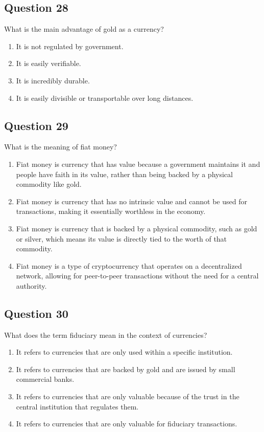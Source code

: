 \documentclass[12pt,a4paper]{article}
\begin{document}
\bigskip


\subsection*{Question 28}
What is the main advantage of gold as a currency?

\begin{enumerate}[label=\Alph*., leftmargin=*]
\item It is not regulated by government.
\item It is easily verifiable.
\item It is incredibly durable.
\item It is easily divisible or transportable over long distances.
\end{enumerate}

\bigskip


\subsection*{Question 29}
What is the meaning of fiat money?

\begin{enumerate}[label=\Alph*., leftmargin=*]
\item Fiat money is currency that has value because a government maintains it and people have faith in its value, rather than being backed by a physical commodity like gold.
\item Fiat money is currency that has no intrinsic value and cannot be used for transactions, making it essentially worthless in the economy.
\item Fiat money is currency that is backed by a physical commodity, such as gold or silver, which means its value is directly tied to the worth of that commodity.
\item Fiat money is a type of cryptocurrency that operates on a decentralized network, allowing for peer-to-peer transactions without the need for a central authority.
\end{enumerate}

\bigskip


\subsection*{Question 30}
What does the term fiduciary mean in the context of currencies?

\begin{enumerate}[label=\Alph*., leftmargin=*]
\item It refers to currencies that are only used within a specific institution.
\item It refers to currencies that are backed by gold and are issued by small commercial banks.
\item It refers to currencies that are only valuable because of the trust in the central institution that regulates them.
\item It refers to currencies that are only valuable for fiduciary transactions.
\end{enumerate}
\end{document}

